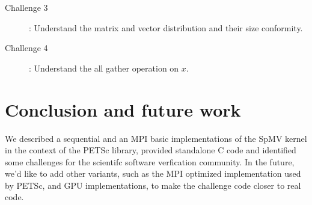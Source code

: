 \documentclass[submission]{eptcs}
\begin{document}
\begin{description}
  \item [Challenge 3]: Understand the matrix and vector distribution and their size conformity.
  \item [Challenge 4]: Understand the all gather operation on $x$.
\end{description}

\section{Conclusion and future work}
We described a sequential and an MPI basic implementations of the SpMV kernel
in the context of the PETSc library, provided standalone C code and identified
some challenges for the scientifc software verfication community.
In the future, we'd like to add other variants,
such as the MPI optimized implementation used by PETSc, and GPU implementations, to make the challenge code closer to real code.

\nocite{*}


\end{document}
